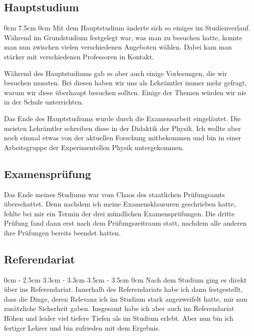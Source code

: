 \begin{multicols*}{2}
\subsection{Hauptstudium}
0cm 7.5cm
0cm \columnwidth
Mit dem Hauptstudium änderte sich so einiges im Studienverlauf.
Während im Grundstudium festgelegt war, was man zu besuchen hatte, konnte man nun zwischen vielen verschiedenen Angeboten wählen.
Dabei kam man stärker mit verschiedenen Professoren in Kontakt.

Während des Hauptstudiums gab es aber auch einige Vorlesungen, die wir besuchen mussten.
Bei diesen haben wir uns als Lehrämtler immer mehr gefragt, warum wir diese überhaupt besuchen sollten.
Einige der Themen würden wir nie in der Schule unterrichten.

Das Ende des Hauptstudiums wurde durch die Examensarbeit eingeläutet.
Die meisten Lehrämtler schreiben diese in der Didaktik der Physik.
Ich wollte aber noch einmal etwas von der aktuellen Forschung mitbekommen und bin in einer Arbeitsgruppe der Experimentellen Physik untergekommen.

\subsection{Examensprüfung}
Das Ende meines Studiums war vom Chaos des staatlichen Prüfungsamts überschattet.
Denn nachdem ich meine Examensklausuren geschrieben hatte, fehlte bei mir ein Termin der drei mündlichen Examensprüfungen.
Die dritte Prüfung fand dann erst nach dem Prüfungszeitraum statt, nachdem alle anderen ihre Prüfungen bereits beendet hatten.

\subsection{Referendariat}
0cm \columnwidth
0cm \columnwidth
0cm \columnwidth
0cm \columnwidth
0cm \columnwidth
0cm \columnwidth
2.5cm \dimexpr\columnwidth - 2.5cm
3.3cm \dimexpr\columnwidth - 3.3cm
3.5cm \dimexpr\columnwidth - 3.5cm
0cm \columnwidth
Nach dem Studium ging es direkt über ins Referendariat.
Innerhalb des Referendariats habe ich dann festgestellt, dass die Dinge, deren Relevanz ich im Studium stark angezweifelt hatte, mir nun zusätzliche Sicherheit gaben.
Insgesamt habe ich aber auch im Referendariat Höhen und leider viel tiefere Tiefen als im Studium erlebt.
Aber nun bin ich fertiger Lehrer und bin zufrieden mit dem Ergebnis.


\end{multicols*}
